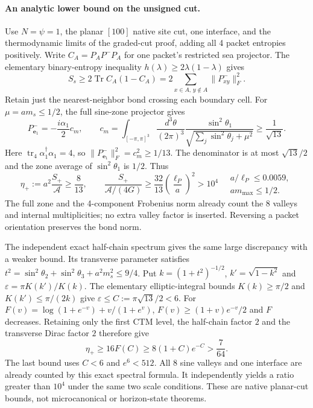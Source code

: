 \documentclass[10pt]{article}
\newcommand{\Tr}{\operatorname{Tr}}
\begin{document}
\paragraph{An analytic lower bound on the unsigned cut.}
Use $N=\psi=1$, the planar $[100]$ native site cut, one interface,
and the thermodynamic limits of the graded-cut proof, adding all
4 packet entropies positively. Write $C_A=P_A P^-P_A$ for one
packet's restricted sea projector. The elementary binary-entropy
inequality $h(\lambda)\geq2\lambda(1-\lambda)$ gives
\[
 S_s\geq2\Tr C_A(1-C_A)
 =2\sum_{x\in A,\,y\notin A}\|P^-_{xy}\|_F^2.
\]
Retain just the nearest-neighbor bond crossing each boundary cell.
For $\mu=a m_s\leq1/2$, the full sine-zone projector gives
\[
 P^-_{\boldsymbol e_1}=-\frac{i\alpha_1}{2}c_m,\qquad
 c_m=\int_{[-\pi,\pi]^3}\frac{d^3\theta}{(2\pi)^3}
 \frac{\sin^2\theta_1}{\sqrt{\sum_j\sin^2\theta_j+\mu^2}}
 \geq\frac1{\sqrt{13}}.
\]
Here $\operatorname{tr}_4\alpha_1^\dagger\alpha_1=4$, so
$\|P^-_{\boldsymbol e_1}\|_F^2=c_m^2\geq1/13$.
The denominator is at most $\sqrt{13}/2$ and the zone average
of $\sin^2\theta_1$ is $1/2$. Thus
\begin{equation}
 \eta_+:=a^2\frac{S_+}{\mathcal A}\geq\frac8{13},\qquad
 \frac{S_+}{\mathcal A/(4G)}\geq
 \frac{32}{13}\left(\frac{\ell_P}{a}\right)^2>10^4
 \quad\begin{matrix}a/\ell_P\leq0.0059,\\a m_{\max}\leq1/2.\end{matrix}
 \label{eq:ec-overshoot}
\end{equation}
The full zone and the 4-component Frobenius norm already count the
8 valleys and internal multiplicities; no extra valley factor is
inserted. Reversing a packet orientation preserves the bond norm.

The independent exact half-chain spectrum gives the same large
discrepancy with a weaker bound. Its transverse parameter satisfies
$t^2=\sin^2\theta_2+\sin^2\theta_3+a^2m_s^2\leq9/4$.
Put $k=(1+t^2)^{-1/2}$, $k'=\sqrt{1-k^2}$ and
$\varepsilon=\pi K(k')/K(k)$. The elementary elliptic-integral
bounds $K(k)\geq\pi/2$ and $K(k')\leq\pi/(2k)$ give
$\varepsilon\leq C:=\pi\sqrt{13}/2<6$.
For $F(v)=\log(1+e^{-v})+v/(1+e^v)$,
$F(v)\geq(1+v)e^{-v}/2$ and $F$ decreases. Retaining only the
first CTM level, the half-chain factor $2$ and the transverse
Dirac factor $2$ therefore give
\[
 \eta_+\geq16F(C)\geq8(1+C)e^{-C}>\frac7{64}.
\]
The last bound uses $C<6$ and $e^6<512$. All 8 sine valleys and
one interface are already counted by this exact spectral formula.
It independently yields a ratio greater than $10^4$ under the same
two scale conditions. These are native planar-cut bounds, not
microcanonical or horizon-state theorems.
\end{document}

